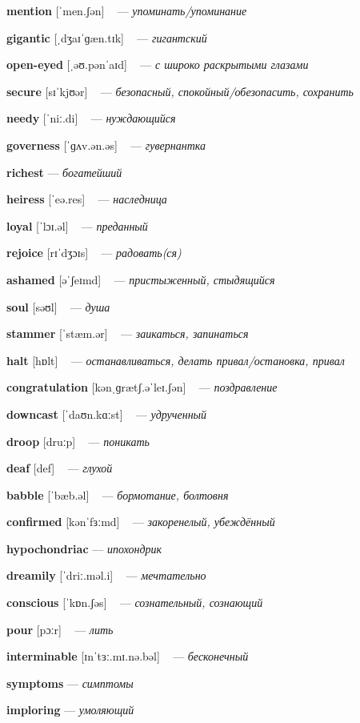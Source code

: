 \documentclass[a4paper,oneside,12pt]{amsart}
\begin{document}
{\large 

 {\bf mention } [ˈmen.ʃən] ~ --- \emph{ упоминать/упоминание }

{\bf gigantic } [ˌdʒaɪˈɡæn.tɪk] ~ --- \emph{ гигантский }

{\bf open-eyed } [ˌəʊ.pənˈaɪd] ~ --- \emph{ с широко раскрытыми глазами }

{\bf secure } [sɪˈkjʊər] ~ --- \emph{ безопасный, спокойный/обезопасить, сохранить }

{\bf needy } [ˈniː.di] ~ --- \emph{ нуждающийся }

{\bf governess } [ˈɡʌv.ən.əs] ~ --- \emph{ гувернантка }

{\bf richest } --- \emph{ богатейший }

{\bf heiress } [ˈeə.res] ~ --- \emph{ наследница }

{\bf loyal } [ˈlɔɪ.əl] ~ --- \emph{ преданный }

{\bf rejoice } [rɪˈdʒɔɪs] ~ --- \emph{ радовать(ся) }

{\bf ashamed } [əˈʃeɪmd] ~ --- \emph{ пристыженный, стыдящийся }

{\bf soul } [səʊl] ~ --- \emph{ душа }

{\bf stammer } [ˈstæm.ər] ~ --- \emph{ заикаться, запинаться }

{\bf halt } [hɒlt] ~ --- \emph{ останавливаться, делать привал/остановка, привал }

{\bf congratulation } [kənˌɡrætʃ.əˈleɪ.ʃən] ~ --- \emph{ поздравление }

{\bf downcast } [ˈdaʊn.kɑːst] ~ --- \emph{ удрученный }

{\bf droop } [druːp] ~ --- \emph{ поникать }

{\bf deaf } [def] ~ --- \emph{ глухой }

{\bf babble } [ˈbæb.əl] ~ --- \emph{ бормотание, болтовня }

{\bf confirmed } [kənˈfɜːmd] ~ --- \emph{ закоренелый, убеждённый }

{\bf hypochondriac } --- \emph{ ипохондрик }

{\bf dreamily } [ˈdriː.məl.i] ~ --- \emph{ мечтательно }

{\bf conscious } [ˈkɒn.ʃəs] ~ --- \emph{ сознательный, сознающий }

{\bf pour } [pɔːr] ~ --- \emph{ лить }

{\bf interminable } [ɪnˈtɜː.mɪ.nə.bəl] ~ --- \emph{ бесконечный }

{\bf symptoms } --- \emph{ симптомы }

{\bf imploring } --- \emph{ умоляющий }

}
\end{document}
